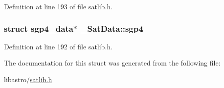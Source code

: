 Definition at line 193 of file satlib.\-h.

\hypertarget{struct___sat_data_a67d36020c0d25eb5a4684978b7fd3df6}{
\subsubsection[{sgp4}]{\setlength{\rightskip}{0pt plus 5cm}struct {\bf sgp4\-\_\-data}$\ast$ \-\_\-\-Sat\-Data\-::sgp4}}\label{struct___sat_data_a67d36020c0d25eb5a4684978b7fd3df6}


Definition at line 192 of file satlib.\-h.



The documentation for this struct was generated from the following file\-:\begin{DoxyCompactItemize}
\item 
libastro/\hyperlink{satlib_8h}{satlib.\-h}\end{DoxyCompactItemize}
